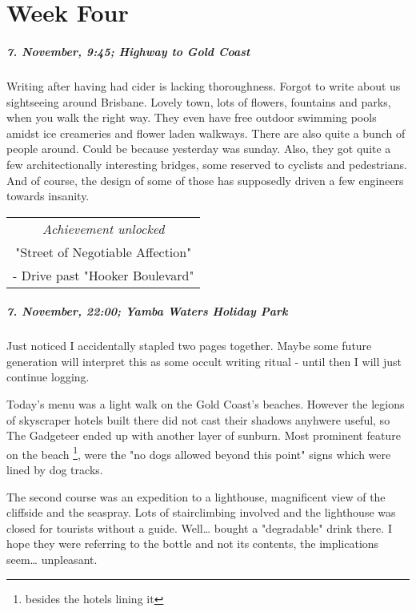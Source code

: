 \chapter{Week Four}


\paragraph{7. November, 9:45; Highway to Gold Coast}
Writing after having had cider is lacking thoroughness.
Forgot to write about us sightseeing around Brisbane.
Lovely town, lots of flowers, fountains and parks, when you walk the right way.
They even have free outdoor swimming pools amidst ice creameries and flower laden walkways.
There are also quite a bunch of people around.
Could be because yesterday was sunday.
Also, they got quite a few architectionally interesting bridges, some reserved to cyclists and pedestrians.
And of course, the design of some of those has supposedly driven a few engineers towards insanity.

\begin{center}
\begin{tabular}{||c||}
\emph{Achievement unlocked}\\
"Street of Negotiable Affection"\\
\multicolumn{1}{||p{0.8\textwidth}||}{\footnotesize - Drive past "Hooker Boulevard"} \\
\end{tabular}
\end{center}

\paragraph{7. November, 22:00; Yamba Waters Holiday Park}
Just noticed I accidentally stapled two pages together.
Maybe some future generation will interpret this as some occult writing ritual - until then I will just continue logging.

Today's menu was a light walk on the Gold Coast's beaches.
However the legions of skyscraper hotels built there did not cast their shadows anyhwere useful, so The Gadgeteer ended up with another layer of sunburn.
Most prominent feature on the beach \footnote{besides the hotels lining it}, were the "no dogs allowed beyond this point" signs which were lined by dog tracks.

The second course was an expedition to a lighthouse, magnificent view of the cliffside and the seaspray.
Lots of stairclimbing involved and the lighthouse was closed for tourists without a guide.
Well\ldots{} bought a "degradable" drink there.
I hope they were referring to the bottle and not its contents, the implications seem\ldots{} unpleasant.

